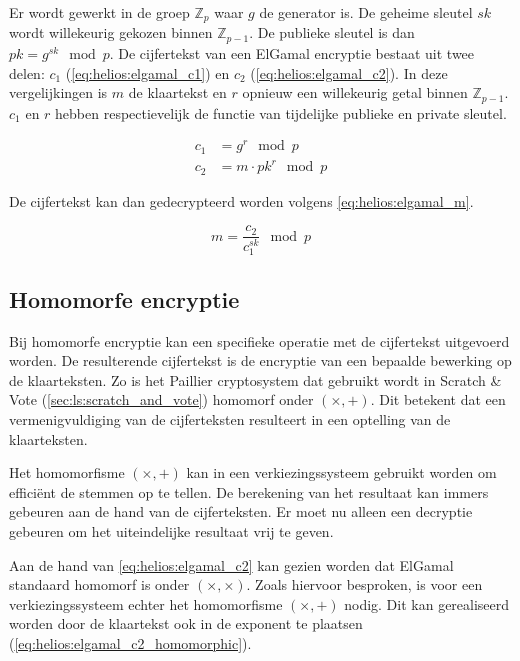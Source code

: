 \npar Er wordt gewerkt in de groep $\mathbb{Z}_p$ waar $g$ de generator is. De geheime sleutel $sk$ wordt willekeurig gekozen binnen $\mathbb{Z}_{p-1}$. De publieke sleutel is dan ${pk} = g^{sk} \mod{p}$. De cijfertekst van een ElGamal encryptie bestaat uit twee delen: $c_1$ (\ref{eq:helios:elgamal_c1}) en $c_2$ (\ref{eq:helios:elgamal_c2}). In deze vergelijkingen is $m$ de klaartekst en $r$ opnieuw een willekeurig getal binnen $\mathbb{Z}_{p-1}$. $c_1$ en $r$ hebben respectievelijk de functie van tijdelijke publieke en private sleutel.\cite{preneel_cryptography_and_network_security}

\begin{align}
  \label{eq:helios:elgamal_c1} 
  c_1 & = g^r \mod{p} \\
  \label{eq:helios:elgamal_c2}
  c_2 & = m \cdot {pk}^r \mod{p}
\end{align}

\npar De cijfertekst kan dan gedecrypteerd worden volgens \ref{eq:helios:elgamal_m}.

\begin{equation}
  \label{eq:helios:elgamal_m}
  m = \frac{c_2}{c_1^{sk}} \mod{p}
\end{equation}

\subsection{Homomorfe encryptie}
\label{sec:helios:homomorfe_encryptie}

Bij homomorfe encryptie kan een specifieke operatie met de cijfertekst uitgevoerd worden. De resulterende cijfertekst is de encryptie van een bepaalde bewerking op de klaarteksten.\cite{wiki:homomorphic_encryption} Zo is het Paillier cryptosystem dat gebruikt wordt in Scratch \& Vote (\ref{sec:ls:scratch_and_vote}) homomorf onder $(\times, +)$. Dit betekent dat een vermenigvuldiging van de cijferteksten resulteert in een optelling van de klaarteksten.

\npar Het homomorfisme $(\times, +)$ kan in een verkiezingssysteem gebruikt worden om effici\"ent de stemmen op te tellen. De berekening van het resultaat kan immers gebeuren aan de hand van de cijferteksten. Er moet nu alleen een decryptie gebeuren om het uiteindelijke resultaat vrij te geven.

\npar Aan de hand van \ref{eq:helios:elgamal_c2} kan gezien worden dat ElGamal standaard homomorf is onder $(\times, \times)$. Zoals hiervoor besproken, is voor een verkiezingssysteem echter het homomorfisme $(\times, +)$ nodig. Dit kan gerealiseerd worden door de klaartekst ook in de exponent te plaatsen (\ref{eq:helios:elgamal_c2_homomorphic}).


